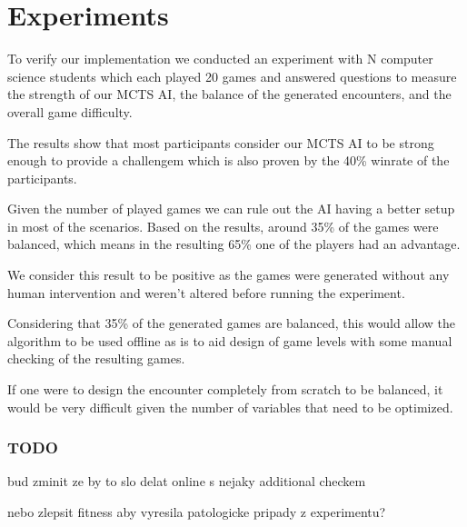 \chapter{Experiments}

To verify our implementation we conducted an experiment with N 
computer science students which each played 20 games and answered questions
to measure the strength of our MCTS AI, the balance of the generated encounters,
and the overall game difficulty.


The results show that most participants consider our MCTS AI to be strong
enough to provide a challengem which is also proven by the 40\% winrate of
the participants. 

Given the number of played games  we can
rule out the AI having a better setup in most of the scenarios. Based on the
results, around 35\%  of the games were balanced,
which means in the resulting 65\% one of the players had an advantage.

We consider this result to be positive as the games were generated without
any human intervention and weren't altered before running the experiment.

Considering that 35\% of the generated games are balanced, this would allow
the algorithm to be used offline as is to aid design of game levels with
some manual checking of the resulting games.

If one were to design the encounter completely from scratch to be balanced,
it would be very difficult given the number of variables that need to be
optimized.

\subsection{TODO}

\begin{description}[align=right,labelwidth=3cm]
\item bud zminit ze by to slo delat online s nejaky additional checkem
\item nebo zlepsit fitness aby vyresila patologicke pripady z experimentu?
\end{description}


